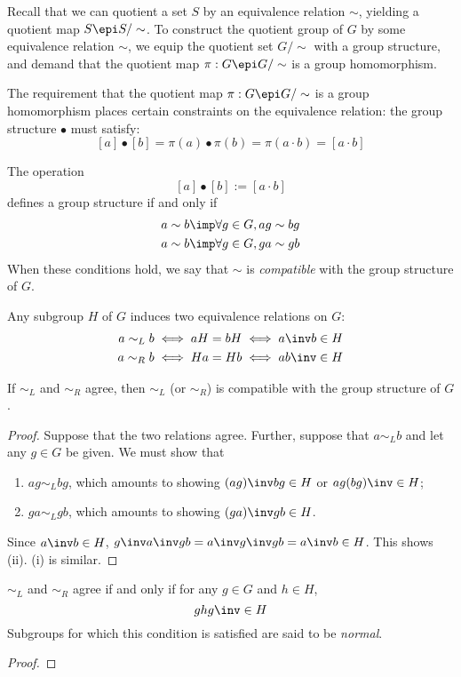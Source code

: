 \documentclass{amsart}
\begin{document}
Recall that we can quotient a set $S$ by an equivalence relation $\sim$, yielding a quotient map $S \epi S/\sim$.
To construct the quotient group of $G$ by some equivalence relation $\sim$, we equip the quotient set $G/\sim$ with a group structure, and demand that the quotient map $\pi : G \epi G/\sim$ is a group homomorphism.

The requirement that the quotient map $\pi : G \epi G/\sim$ is a group homomorphism places certain constraints on the equivalence relation: the group structure $\bullet$ must satisfy:
\[
  [a] \bullet [b] = \pi(a) \bullet \pi(b) = \pi(a \cdot b) = [a \cdot b]
\]
\begin{lem}
  The operation
  \[
    [a] \bullet [b] := [a \cdot b]
  \]
  defines a group structure if and only if
  \begin{align}
    a \sim b &\imp \forall g \in G, ag \sim bg\\
    a \sim b &\imp \forall g \in G, ga \sim gb
  \end{align}
  When these conditions hold, we say that $\sim$ is \emph{compatible} with the group structure of $G$.
\end{lem}

Any subgroup $H$ of $G$ induces two equivalence relations on $G$:
\begin{align}
  a \sim_{L} b &\iff aH = bH \iff a\inv b \in H\\
  a \sim_{R} b &\iff Ha = Hb \iff ab\inv \in H
\end{align}

\begin{lem}
  If $\sim_{L}$ and $\sim_{R}$ agree, then $\sim_{L}$ (or $\sim_{R}$) is compatible with the group structure of $G$.
\end{lem}
\begin{proof}
  Suppose that the two relations agree.
  Further, suppose that $a \sim_{L} b$ and let any $g \in G$ be given.
  We must show that
  \begin{enumerate}
  \item $ag \sim_{L} bg$, which amounts to showing $(ag)\inv bg \in H$ or $ag(bg)\inv \in H$;
  \item $ga \sim_{L} gb$, which amounts to showing $(ga)\inv gb \in H$.
  \end{enumerate}
  Since $a\inv b \in H$, $g\inv a\inv gb = a\inv g\inv gb = a\inv b \in H$.
  This shows (ii).
  (i) is similar.
\end{proof}

\begin{lem}
  $\sim_{L}$ and $\sim_{R}$ agree if and only if for any $g \in G$ and $h \in H$,
  \[
    ghg\inv \in H
  \]
  Subgroups for which this condition is satisfied are said to be \emph{normal}.
\end{lem}
\begin{proof}
  
\end{proof}
\end{document}
